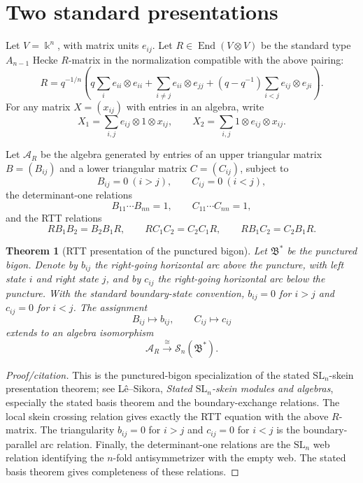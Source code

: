 \documentclass[11pt]{article}
\newtheorem{theorem}{Theorem}[section]
\newcommand{\kfield}{\Bbbk}
\newcommand{\Sc}{\mathcal S}
\newcommand{\fB}{\mathfrak B}
\newcommand{\End}{\operatorname{End}}
\begin{document}
\section{Two standard presentations}

Let \(V=\kfield^n\), with matrix units \(e_{ij}\).  Let \(R\in \End(V\otimes V)\) be the standard type \(A_{n-1}\) Hecke \(R\)-matrix in the normalization compatible with the above pairing:
\[
R
=
q^{-1/n}
\left(
q\sum_i e_{ii}\otimes e_{ii}
+\sum_{i\neq j}e_{ii}\otimes e_{jj}
+(q-q^{-1})\sum_{i<j}e_{ij}\otimes e_{ji}
\right).
\]
For any matrix \(X=(x_{ij})\) with entries in an algebra, write
\[
X_1=\sum_{i,j} e_{ij}\otimes 1\otimes x_{ij},
\qquad
X_2=\sum_{i,j} 1\otimes e_{ij}\otimes x_{ij}.
\]

Let \(\mathcal A_R\) be the algebra generated by entries of an upper triangular matrix \(B=(B_{ij})\) and a lower triangular matrix \(C=(C_{ij})\), subject to
\[
B_{ij}=0\ (i>j),\qquad C_{ij}=0\ (i<j),
\]
the determinant-one relations
\[
B_{11}\cdots B_{nn}=1,\qquad C_{11}\cdots C_{nn}=1,
\]
and the RTT relations
\[
R B_1B_2=B_2B_1R,\qquad
R C_1C_2=C_2C_1R,\qquad
R B_1C_2=C_2B_1R .
\tag{2.1}
\]

\begin{theorem}[RTT presentation of the punctured bigon]
Let \(\fB^*\) be the punctured bigon.  Denote by \(b_{ij}\) the right-going horizontal arc above the puncture, with left state \(i\) and right state \(j\), and by \(c_{ij}\) the right-going horizontal arc below the puncture.  With the standard boundary-state convention, \(b_{ij}=0\) for \(i>j\) and \(c_{ij}=0\) for \(i<j\).  The assignment
\[
B_{ij}\longmapsto b_{ij},\qquad C_{ij}\longmapsto c_{ij}
\]
extends to an algebra isomorphism
\[
\mathcal A_R \xrightarrow{\ \cong\ } \Sc_n(\fB^*).
\]
\end{theorem}

\begin{proof}[Proof/citation]
This is the punctured-bigon specialization of the stated \(\mathrm{SL}_n\)-skein presentation theorem; see L\^e--Sikora, \emph{Stated \(\mathrm{SL}_n\)-skein modules and algebras}, especially the stated basis theorem and the boundary-exchange relations.  The local skein crossing relation gives exactly the RTT equation with the above \(R\)-matrix.  The triangularity \(b_{ij}=0\) for \(i>j\) and \(c_{ij}=0\) for \(i<j\) is the boundary-parallel arc relation.  Finally, the determinant-one relations are the \(\mathrm{SL}_n\) web relation identifying the \(n\)-fold antisymmetrizer with the empty web.  The stated basis theorem gives completeness of these relations.
\end{proof}
\end{document}
